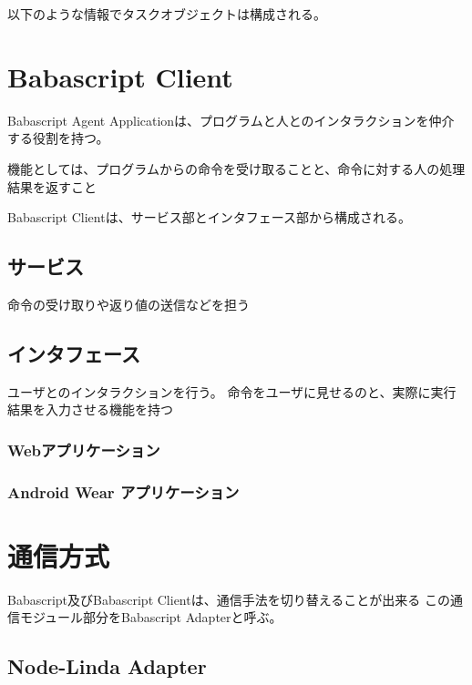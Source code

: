以下のような情報でタスクオブジェクトは構成される。

\section{Babascript Client}

Babascript Agent Applicationは、プログラムと人とのインタラクションを仲介する役割を持つ。

機能としては、プログラムからの命令を受け取ることと、命令に対する人の処理結果を返すこと

Babascript Clientは、サービス部とインタフェース部から構成される。

\subsection{サービス}

命令の受け取りや返り値の送信などを担う

\subsection{インタフェース}

ユーザとのインタラクションを行う。
命令をユーザに見せるのと、実際に実行結果を入力させる機能を持つ

\subsubsection{Webアプリケーション}
\subsubsection{Android Wear アプリケーション}

\section{通信方式}

Babascript及びBabascript Clientは、通信手法を切り替えることが出来る
この通信モジュール部分をBabascript Adapterと呼ぶ。


\subsection{Node-Linda Adapter}

